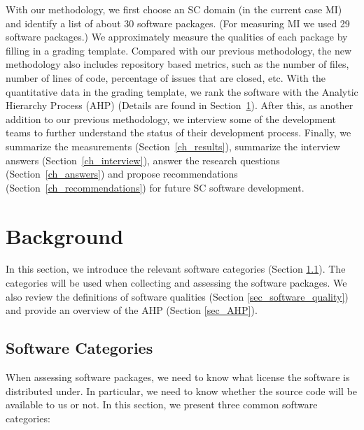 \documentclass[final, 3p, times, authoryear]{elsarticle}
\begin{document}
With our methodology, we first choose an SC domain (in the current case MI) and
identify a list of about 30 software packages. (For measuring MI we used 29
software packages.)  We approximately measure the qualities of each package by
filling in a grading template. Compared with our previous methodology, the new
methodology also includes repository based metrics, such as the number of files,
number of lines of code, percentage of issues that are closed, etc.  With the
quantitative data in the grading template, we rank the software with the
Analytic Hierarchy Process (AHP) (Details are found in
Section~\ref{ch_background}). After this, as another addition to our previous
methodology, we interview some of the development teams to further understand
the status of their development process. Finally, we summarize the measurements
(Section~\ref{ch_results}), summarize the interview answers
(Section~\ref{ch_interview}), answer the research questions
(Section~\ref{ch_answers}) and propose recommendations
(Section~\ref{ch_recommendations}) for future SC software development.

\section{Background} \label{ch_background}

In this section, we introduce the relevant software categories (Section
\ref{sec_software_categories}). The categories will be used when collecting and
assessing the software packages.  We also review the definitions of software
qualities (Section \ref{sec_software_quality}) and provide an overview of the
AHP (Section \ref{sec_AHP}).

\subsection{Software Categories} \label{sec_software_categories}

When assessing software packages, we need to know what license the software is
distributed under.  In particular, we need to know whether the source code will
be available to us or not.  In this section, we present three common software
categories:
\end{document}

